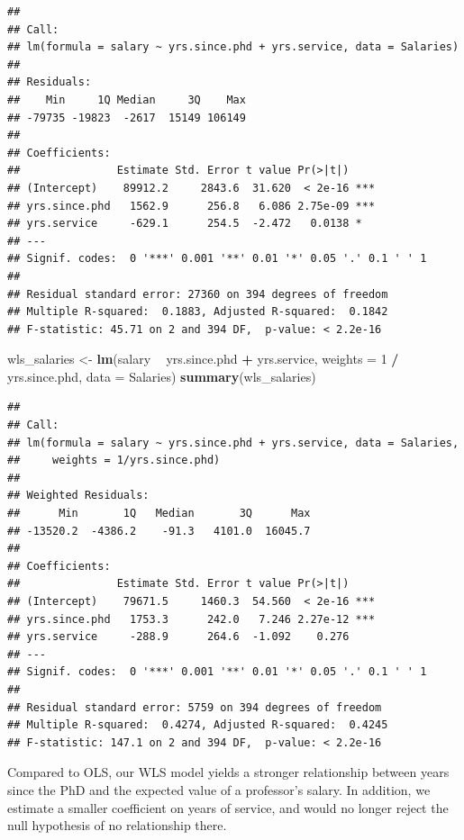 \documentclass[12pt,oneside,openany]{book}
\newenvironment{Shaded}{\begin{snugshade}}{\end{snugshade}}
\newcommand{\KeywordTok}[1]{\textcolor[rgb]{0.13,0.29,0.53}{\textbf{#1}}}
\newcommand{\DataTypeTok}[1]{\textcolor[rgb]{0.13,0.29,0.53}{#1}}
\newcommand{\DecValTok}[1]{\textcolor[rgb]{0.00,0.00,0.81}{#1}}
\newcommand{\StringTok}[1]{\textcolor[rgb]{0.31,0.60,0.02}{#1}}
\newcommand{\OperatorTok}[1]{\textcolor[rgb]{0.81,0.36,0.00}{\textbf{#1}}}
\newcommand{\NormalTok}[1]{#1}
\begin{document}
\begin{verbatim}
## 
## Call:
## lm(formula = salary ~ yrs.since.phd + yrs.service, data = Salaries)
## 
## Residuals:
##    Min     1Q Median     3Q    Max 
## -79735 -19823  -2617  15149 106149 
## 
## Coefficients:
##               Estimate Std. Error t value Pr(>|t|)    
## (Intercept)    89912.2     2843.6  31.620  < 2e-16 ***
## yrs.since.phd   1562.9      256.8   6.086 2.75e-09 ***
## yrs.service     -629.1      254.5  -2.472   0.0138 *  
## ---
## Signif. codes:  0 '***' 0.001 '**' 0.01 '*' 0.05 '.' 0.1 ' ' 1
## 
## Residual standard error: 27360 on 394 degrees of freedom
## Multiple R-squared:  0.1883, Adjusted R-squared:  0.1842 
## F-statistic: 45.71 on 2 and 394 DF,  p-value: < 2.2e-16
\end{verbatim}

\begin{Shaded}
\begin{Highlighting}[]
\NormalTok{wls_salaries <-}\StringTok{ }\KeywordTok{lm}\NormalTok{(salary }\OperatorTok{~}\StringTok{ }\NormalTok{yrs.since.phd }\OperatorTok{+}\StringTok{ }\NormalTok{yrs.service,}
                   \DataTypeTok{weights =} \DecValTok{1} \OperatorTok{/}\StringTok{ }\NormalTok{yrs.since.phd,}
                   \DataTypeTok{data =}\NormalTok{ Salaries)}
\KeywordTok{summary}\NormalTok{(wls_salaries)}
\end{Highlighting}
\end{Shaded}

\begin{verbatim}
## 
## Call:
## lm(formula = salary ~ yrs.since.phd + yrs.service, data = Salaries, 
##     weights = 1/yrs.since.phd)
## 
## Weighted Residuals:
##      Min       1Q   Median       3Q      Max 
## -13520.2  -4386.2    -91.3   4101.0  16045.7 
## 
## Coefficients:
##               Estimate Std. Error t value Pr(>|t|)    
## (Intercept)    79671.5     1460.3  54.560  < 2e-16 ***
## yrs.since.phd   1753.3      242.0   7.246 2.27e-12 ***
## yrs.service     -288.9      264.6  -1.092    0.276    
## ---
## Signif. codes:  0 '***' 0.001 '**' 0.01 '*' 0.05 '.' 0.1 ' ' 1
## 
## Residual standard error: 5759 on 394 degrees of freedom
## Multiple R-squared:  0.4274, Adjusted R-squared:  0.4245 
## F-statistic: 147.1 on 2 and 394 DF,  p-value: < 2.2e-16
\end{verbatim}

Compared to OLS, our WLS model yields a stronger relationship between
years since the PhD and the expected value of a professor's salary. In
addition, we estimate a smaller coefficient on years of service, and
would no longer reject the null hypothesis of no relationship there.
\end{document}
